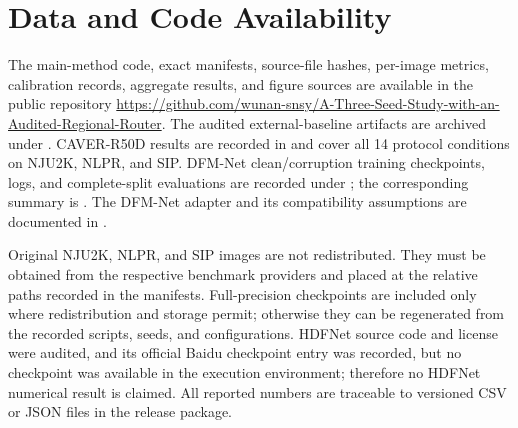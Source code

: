 \section*{Data and Code Availability}
The main-method code, exact manifests, source-file hashes, per-image metrics, calibration records, aggregate results, and figure sources are available in the public repository \url{https://github.com/wunan-snsy/A-Three-Seed-Study-with-an-Audited-Regional-Router}. The audited external-baseline artifacts are archived under . CAVER-R50D results are recorded in  and cover all 14 protocol conditions on NJU2K, NLPR, and SIP. DFM-Net clean/corruption training checkpoints, logs, and complete-split evaluations are recorded under ; the corresponding summary is . The DFM-Net adapter and its compatibility assumptions are documented in .

Original NJU2K, NLPR, and SIP images are not redistributed. They must be obtained from the respective benchmark providers and placed at the relative paths recorded in the manifests. Full-precision checkpoints are included only where redistribution and storage permit; otherwise they can be regenerated from the recorded scripts, seeds, and configurations. HDFNet source code and license were audited, and its official Baidu checkpoint entry was recorded, but no checkpoint was available in the execution environment; therefore no HDFNet numerical result is claimed. All reported numbers are traceable to versioned CSV or JSON files in the release package.
